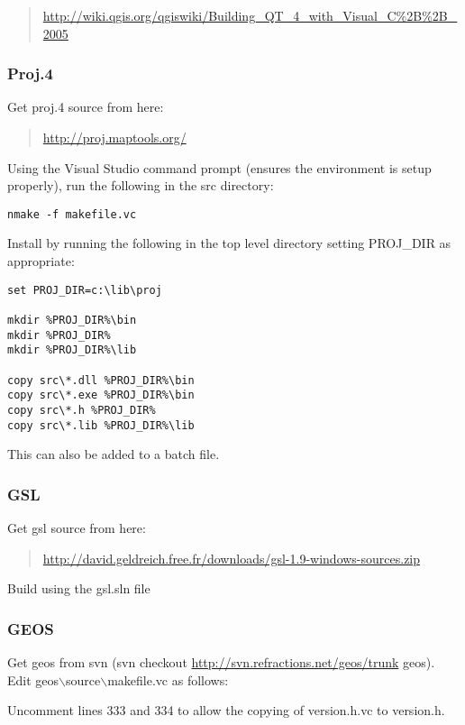 	\begin{quotation}
\url{http://wiki.qgis.org/qgiswiki/Building\_QT\_4\_with\_Visual\_C\%2B\%2B\_2005}
	\end{quotation}

\subsubsection{Proj.4}
Get proj.4 source from here:

	\begin{quotation}
\url{http://proj.maptools.org/}
	\end{quotation}
Using the Visual Studio command prompt (ensures the environment is setup properly), run the following in the src directory:

\begin{verbatim}
nmake -f makefile.vc
\end{verbatim}

Install by running the following in the top level directory setting PROJ\_DIR as appropriate:

\begin{verbatim}
set PROJ_DIR=c:\lib\proj

mkdir %PROJ_DIR%\bin
mkdir %PROJ_DIR%
mkdir %PROJ_DIR%\lib

copy src\*.dll %PROJ_DIR%\bin
copy src\*.exe %PROJ_DIR%\bin
copy src\*.h %PROJ_DIR%
copy src\*.lib %PROJ_DIR%\lib 
\end{verbatim}

This can also be added to a batch file.

\subsubsection{GSL}
Get gsl source from here:

	\begin{quotation}
\url{http://david.geldreich.free.fr/downloads/gsl-1.9-windows-sources.zip}
	\end{quotation}
Build using the gsl.sln file

\subsubsection{GEOS}
Get geos from svn (svn checkout \url{http://svn.refractions.net/geos/trunk} geos).
Edit geos$\backslash$source$\backslash$makefile.vc as follows:

Uncomment lines 333 and 334 to allow the copying of version.h.vc to version.h.

